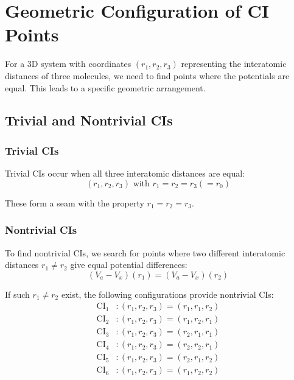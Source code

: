 \documentclass{article}
\begin{document}
\section{Geometric Configuration of CI Points}

For a 3D system with coordinates $(r_1, r_2, r_3)$ representing the interatomic distances of three molecules, we need to find points where the potentials are equal. This leads to a specific geometric arrangement.

\subsection{Trivial and Nontrivial CIs}

\subsubsection{Trivial CIs}

Trivial CIs occur when all three interatomic distances are equal:
\begin{equation}
(r_1, r_2, r_3) \text{ with } r_1 = r_2 = r_3 (= r_0)
\end{equation}

These form a seam with the property $r_1 = r_2 = r_3$.

\subsubsection{Nontrivial CIs}

To find nontrivial CIs, we search for points where two different interatomic distances $r_1 \neq r_2$ give equal potential differences:
\begin{equation}
(V_a - V_x)(r_1) = (V_a - V_x)(r_2)
\end{equation}

If such $r_1 \neq r_2$ exist, the following configurations provide nontrivial CIs:
\begin{align}
\text{CI}_1 &: (r_1, r_2, r_3) = (r_1, r_1, r_2) \\
\text{CI}_2 &: (r_1, r_2, r_3) = (r_1, r_2, r_1) \\
\text{CI}_3 &: (r_1, r_2, r_3) = (r_2, r_1, r_1) \\
\text{CI}_4 &: (r_1, r_2, r_3) = (r_2, r_2, r_1) \\
\text{CI}_5 &: (r_1, r_2, r_3) = (r_2, r_1, r_2) \\
\text{CI}_6 &: (r_1, r_2, r_3) = (r_1, r_2, r_2)
\end{align}
\end{document}
